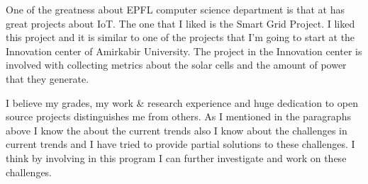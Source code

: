 \documentclass[11pt,a4paper,sans]{moderncv}        %
\begin{document}
One of the greatness about EPFL computer science department is that at has great
projects about IoT. The one that I liked is the Smart Grid Project. I liked
this project and it is similar to one of the projects that I'm going to start
at the Innovation center of Amirkabir University. The project in the Innovation center is involved with
collecting metrics about the solar cells and the amount of power that they generate.

I believe my grades, my work \& research experience and huge dedication
to open source projects distinguishes me from others. As I mentioned in the
paragraphs above I know the about the current trends also I know about the
challenges in current trends and I have tried to provide partial solutions
to these challenges. I think by involving in this program I can further
investigate and work on these challenges.

\makeletterclosing
\end{document}
